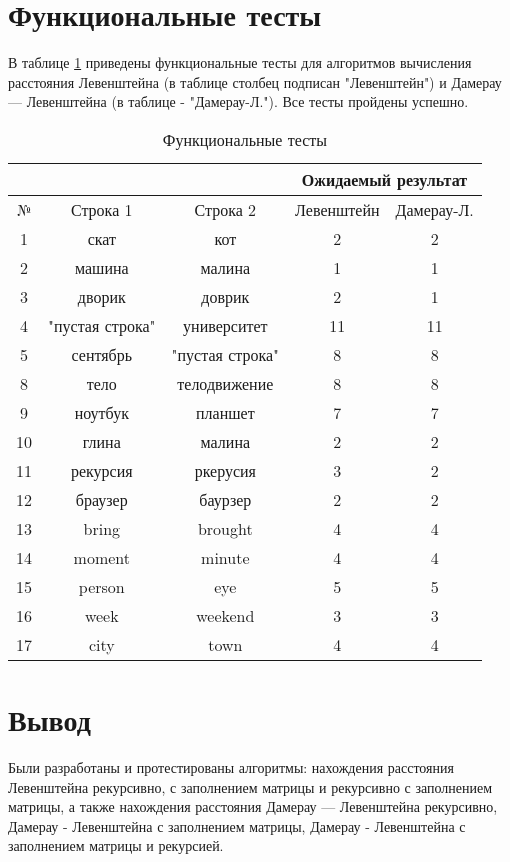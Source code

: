\section{Функциональные тесты}
В таблице \ref{tabular:functional_test} приведены функциональные тесты для алгоритмов вычисления расстояния Левенштейна (в таблице столбец подписан "Левенштейн") и Дамерау — Левенштейна (в таблице - "Дамерау-Л."). Все тесты пройдены успешно.


\begin{table}[h]
	\begin{center}
		\caption{\label{tabular:functional_test} Функциональные тесты}
		\begin{tabular}{|c|c|c|c|c|}
			\hline
			& & & \multicolumn{2}{c|}{Ожидаемый результат} \\
			\hline
			№&Строка 1&Строка 2&Левенштейн&Дамерау-Л. \\
			\hline
			1&скат&кот&2&2 \\
			\hline
			2&машина&малина&1&1 \\
			\hline
			3&дворик&доврик&2&1 \\
			\hline
			4&"пустая строка"&университет&11&11 \\
			\hline
			5&сентябрь&"пустая строка"&8&8 \\
			\hline
			8&тело&телодвижение&8&8 \\
			\hline
			9&ноутбук&планшет&7&7 \\
			\hline
			10&глина&малина&2&2 \\
			\hline
			11&рекурсия&ркерусия&3&2 \\
			\hline
			12&браузер&баурзер&2&2 \\
			\hline
			13&bring&brought&4&4 \\
			\hline
			14&moment&minute&4&4 \\ 
			\hline
			15&person&eye&5&5 \\
			\hline
			16&week&weekend&3&3 \\
			\hline 
			17&city&town&4&4 \\
			\hline
		\end{tabular}
	\end{center}
\end{table}


\section*{Вывод}

Были разработаны и протестированы алгоритмы: нахождения расстояния Левенштейна рекурсивно, с заполнением матрицы и рекурсивно с заполнением матрицы, а также нахождения расстояния Дамерау — Левенштейна рекурсивно, Дамерау - Левенштейна с заполнением матрицы, Дамерау - Левенштейна с заполнением матрицы и рекурсией.
